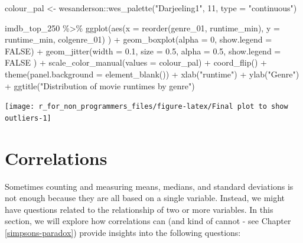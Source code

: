 \documentclass[
]{book}
\newenvironment{Shaded}{\begin{snugshade}}{\end{snugshade}}
\newcommand{\AttributeTok}[1]{\textcolor[rgb]{0.77,0.63,0.00}{#1}}
\newcommand{\ConstantTok}[1]{\textcolor[rgb]{0.00,0.00,0.00}{#1}}
\newcommand{\DecValTok}[1]{\textcolor[rgb]{0.00,0.00,0.81}{#1}}
\newcommand{\FloatTok}[1]{\textcolor[rgb]{0.00,0.00,0.81}{#1}}
\newcommand{\FunctionTok}[1]{\textcolor[rgb]{0.00,0.00,0.00}{#1}}
\newcommand{\NormalTok}[1]{#1}
\newcommand{\OtherTok}[1]{\textcolor[rgb]{0.56,0.35,0.01}{#1}}
\newcommand{\SpecialCharTok}[1]{\textcolor[rgb]{0.00,0.00,0.00}{#1}}
\newcommand{\StringTok}[1]{\textcolor[rgb]{0.31,0.60,0.02}{#1}}
\begin{document}
\begin{Shaded}
\begin{Highlighting}[]
\NormalTok{colour\_pal }\OtherTok{\textless{}{-}}\NormalTok{ wesanderson}\SpecialCharTok{::}\FunctionTok{wes\_palette}\NormalTok{(}\StringTok{"Darjeeling1"}\NormalTok{, }\DecValTok{11}\NormalTok{, }\AttributeTok{type =} \StringTok{"continuous"}\NormalTok{)}

\NormalTok{imdb\_top\_250 }\SpecialCharTok{\%\textgreater{}\%}
  \FunctionTok{ggplot}\NormalTok{(}\FunctionTok{aes}\NormalTok{(}\AttributeTok{x =} \FunctionTok{reorder}\NormalTok{(genre\_01, runtime\_min),}
             \AttributeTok{y =}\NormalTok{ runtime\_min,}
\NormalTok{             colgenre\_01)}
\NormalTok{         ) }\SpecialCharTok{+}
  \FunctionTok{geom\_boxplot}\NormalTok{(}\AttributeTok{alpha =} \DecValTok{0}\NormalTok{,}
               \AttributeTok{show.legend =} \ConstantTok{FALSE}\NormalTok{) }\SpecialCharTok{+}
  \FunctionTok{geom\_jitter}\NormalTok{(}\AttributeTok{width =} \FloatTok{0.1}\NormalTok{,}
              \AttributeTok{size =} \FloatTok{0.5}\NormalTok{,}
              \AttributeTok{alpha =} \FloatTok{0.5}\NormalTok{,}
              \AttributeTok{show.legend =} \ConstantTok{FALSE}
\NormalTok{              ) }\SpecialCharTok{+}
  \FunctionTok{scale\_color\_manual}\NormalTok{(}\AttributeTok{values =}\NormalTok{ colour\_pal) }\SpecialCharTok{+}
  \FunctionTok{coord\_flip}\NormalTok{() }\SpecialCharTok{+}
  \FunctionTok{theme}\NormalTok{(}\AttributeTok{panel.background =} \FunctionTok{element\_blank}\NormalTok{()) }\SpecialCharTok{+}
  \FunctionTok{xlab}\NormalTok{(}\StringTok{"runtime"}\NormalTok{) }\SpecialCharTok{+}
  \FunctionTok{ylab}\NormalTok{(}\StringTok{"Genre"}\NormalTok{) }\SpecialCharTok{+}
  \FunctionTok{ggtitle}\NormalTok{(}\StringTok{"Distribution of movie runtimes by genre"}\NormalTok{)}
\end{Highlighting}
\end{Shaded}

\begin{center}\texttt{[image: r\_for\_non\_programmers\_files/figure-latex/Final plot to show outliers-1]} \end{center}

\hypertarget{correlations}{%
\chapter{Correlations}\label{correlations}}

Sometimes counting and measuring means, medians, and standard deviations is not enough because they are all based on a single variable. Instead, we might have questions related to the relationship of two or more variables. In this section, we will explore how correlations can (and kind of cannot - see Chapter \ref{simpsons-paradox}) provide insights into the following questions:
\end{document}
